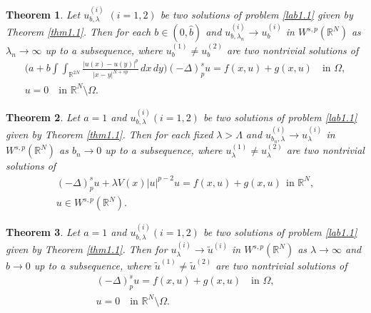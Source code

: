 \documentclass[10pt,a4paper]{amsart}
\numberwithin{equation}{section}
\newtheorem{theorem}{Theorem}[section]
\begin{document}
\begin{theorem} \label{thm1.2}
Let $u^{(i)}_{b,\lambda}$ $(i=1,2)$ be two solutions of problem \eqref{lab1.1} 
given by Theorem \ref{thm1.1}. Then for each $b\in(0, \widehat{b})$ and 
$u^{(i)}_{b,\lambda_n}\to  u_b^{(i)}$ in $W^{s,p}(\mathbb{R}^N)$ as 
$\lambda_n\to \infty$ up to a subsequence, where $u_b^{(1)}\neq u_b^{(2)}$ are 
two nontrivial solutions of
\begin{equation}\label{lab1.4}
\begin{gathered}
\Big(a+b\int\int_{\mathbb{R}^{2N}}\frac{|u(x)-u(y)|^p}{|x-y|^{N+sp}}\,dx\,dy\Big)
(-\Delta)_p^su=f(x,u)+g(x,u)\quad \text{in }\Omega,\\
u=0\quad \text{in }\mathbb{R}^N\setminus\Omega.
\end{gathered}
\end{equation}
\end{theorem}

\begin{theorem} \label{thm1.3}
Let $a=1$ and $u^{(i)}_{b,\lambda} (i=1,2)$ be two solutions of problem 
\eqref{lab1.1} given by Theorem \ref{thm1.1}. Then for each fixed $\lambda>\Lambda$
and $u^{(i)}_{b_n,\lambda}\to  u_\lambda^{(i)}$ in $W^{s,p}(\mathbb{R}^N)$ as 
$b_n\to 0$  up to a subsequence, where $u_\lambda^{(1)}\neq u_\lambda^{(2)}$ are 
two nontrivial solutions of
\begin{equation}\label{lab1.5}
\begin{gathered}
(-\Delta)_p^su+\lambda V(x)|u|^{p-2}u=f(x,u)+g(x,u)\ \ \text{in }\mathbb{R}^N,\\
u\in W^{s,p}(\mathbb{R}^N).
\end{gathered}
\end{equation}
\end{theorem}

\begin{theorem} \label{thm1.4}
Let $a=1$ and $u^{(i)}_{b,\lambda} (i=1,2)$ be two solutions of problem 
\eqref{lab1.1} given by Theorem \ref{thm1.1}. Then for 
$u^{(i)}_\lambda\to  \widetilde{u}^{(i)}$ in $W^{s,p}(\mathbb{R}^N)$ as 
$\lambda\to \infty$ and $b\to 0$ up to a subsequence, where 
$\widetilde{u}^{(1)}\neq \widetilde{u}^{(2)}$ are two nontrivial solutions of
\begin{gather*}
(-\Delta)_p^su=f(x,u)+g(x,u)\quad \text{in }\Omega,\\
u=0\quad \text{in }\mathbb{R}^N\setminus\Omega.
\end{gather*}
\end{theorem}
\end{document}
